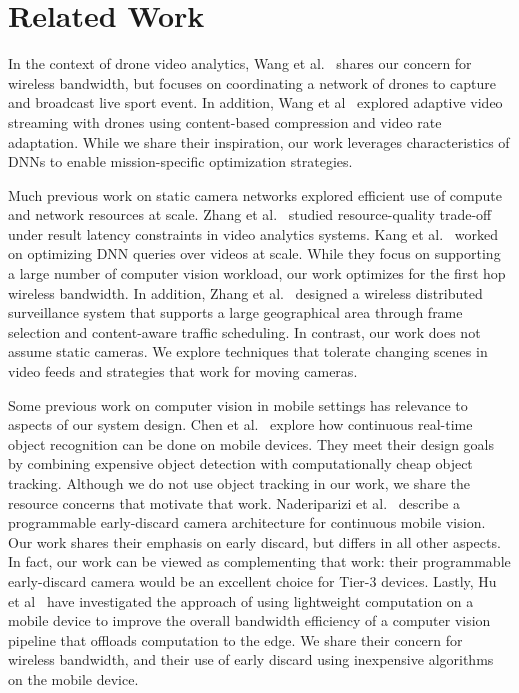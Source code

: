 





\section{Related Work}
\label{bw:relatedwork}

In the context of drone video analytics, Wang et al.~\cite{Wang2017networked}
shares our concern for wireless bandwidth, but focuses on coordinating a network
of drones to capture and broadcast live sport event. In addition, Wang et
al~\cite{Wang2016skyeyes} explored adaptive video streaming with drones using
content-based compression and video rate adaptation. While we share their
inspiration, our work leverages characteristics of DNNs to enable
mission-specific optimization strategies.

Much previous work on static camera networks explored efficient use of compute
and network resources at scale. Zhang et al.~\cite{zhang2017live} studied
resource-quality trade-off under result latency constraints in video analytics
systems. Kang et al.~\cite{kang2017noscope} worked on optimizing DNN queries
over videos at scale. While they focus on supporting a large number of computer
vision workload, our work optimizes for the first hop wireless bandwidth. In
addition, Zhang et al.~\cite{zhang2015design} designed a wireless distributed
surveillance system that supports a large geographical area through frame
selection and content-aware traffic scheduling. In contrast, our work does not
assume static cameras. We explore techniques that tolerate changing scenes in
video feeds and strategies that work for moving cameras.

Some previous work on computer vision in mobile settings has relevance to
aspects of our system design.  Chen et al.~\cite{chen2015glimpse} explore how
continuous real-time object recognition can be done on mobile devices. They meet
their design goals by combining expensive object detection with computationally
cheap object tracking.  Although we do not use object tracking in our work, we
share the resource concerns that motivate that work.  Naderiparizi et
al.~\cite{naderiparizi2017glimpse} describe a programmable early-discard camera
architecture for continuous mobile vision.  Our work shares their emphasis on
early discard, but differs in all other aspects.  In fact, our work can be
viewed as complementing that work: their programmable early-discard camera would
be an excellent choice for Tier-3 devices. Lastly, Hu et al~\cite{Hu2015} have
investigated the approach of using lightweight computation on a mobile device to
improve the overall bandwidth efficiency of a computer vision pipeline that
offloads computation to the edge.  We share their concern for wireless
bandwidth, and their use of early discard using inexpensive algorithms on the
mobile device.

